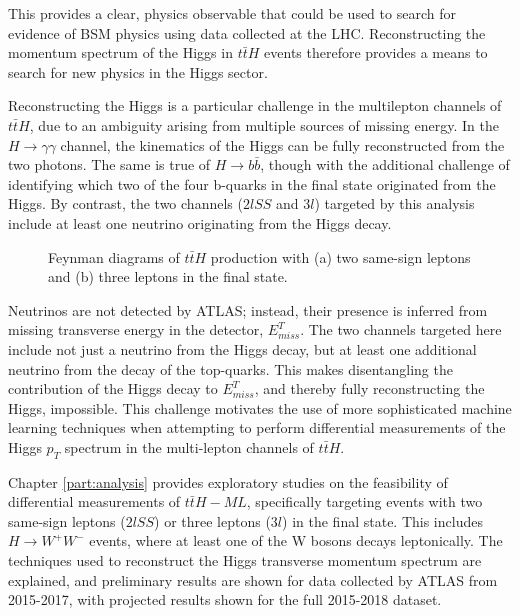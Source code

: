 This provides a clear, physics observable that could be used to search for evidence of BSM physics using data collected at the LHC. Reconstructing the momentum spectrum of the Higgs in $t\bar{t}H$ events therefore provides a means to search for new physics in the Higgs sector.

Reconstructing the Higgs is a particular challenge in the multilepton channels of $t\bar{t}H$, due to an ambiguity arising from multiple sources of missing energy. In the $H\rightarrow \gamma\gamma$ channel, the kinematics of the Higgs can be fully reconstructed from the two photons. The same is true of $H\rightarrow b\bar{b}$, though with the additional challenge of identifying which two of the four b-quarks in the final state originated from the Higgs. By contrast, the two channels ($2lSS$ and $3l$) targeted by this analysis include at least one neutrino originating from the Higgs decay. 

\begin{figure}[H]
    \centering
    \caption{Feynman diagrams of $t\bar{t}H$ production with (a) two same-sign leptons and (b) three leptons in the final state.}
    \label{fig:ttH-2lSS-3l}
\end{figure}

Neutrinos are not detected by ATLAS; instead, their presence is inferred from missing transverse energy in the detector, $E^T_{miss}$. The two channels targeted here include not just a neutrino from the Higgs decay, but at least one additional neutrino from the decay of the top-quarks. This makes disentangling the contribution of the Higgs decay to $E^T_{miss}$, and thereby fully reconstructing the Higgs, impossible. This challenge motivates the use of more sophisticated machine learning techniques when attempting to perform differential measurements of the Higgs $p_T$ spectrum in the multi-lepton channels of $t\bar{t}H$. 

Chapter \ref{part:analysis} provides exploratory studies on the feasibility of differential measurements of $t\bar{t}H-ML$, specifically targeting events with two same-sign leptons ($2lSS$) or three leptons ($3l$) in the final state. This includes $H \rightarrow W^+W^-$ events, where at least one of the W bosons decays leptonically. The techniques used to reconstruct the Higgs transverse momentum spectrum are explained, and preliminary results are shown for data collected by ATLAS from 2015-2017, with projected results shown for the full 2015-2018 dataset.


